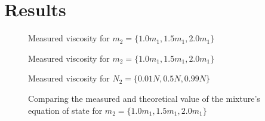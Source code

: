 \chapter{Results}

\begin{figure}[htbp]
    \begin{center}
        
        \caption{
            Measured viscosity for $m_2 = 
            \{1.0m_1, 1.5m_1, 2.0m_1\}$
        }
    \end{center}
\end{figure}
\begin{figure}[htbp]
    \begin{center}
        
        \caption{
            Measured viscosity for $m_2 = 
            \{1.0m_1, 1.5m_1, 2.0m_1\}$
        }
    \end{center}
\end{figure}


\begin{figure}[htbp]
    \begin{center}
        
        \caption{
            Measured viscosity for $N_2 = 
            \{0.01N, 0.5N, 0.99N\}$
        }
    \end{center}
\end{figure}
%
%        
\begin{figure}[htbp]
    \begin{center}
        
    \end{center}
        \caption{
            Comparing the measured and theoretical value of the mixture's
            equation of state for $m_2 = \{1.0m_1, 1.5m_1, 2.0m_1\}$
        }
\end{figure}
